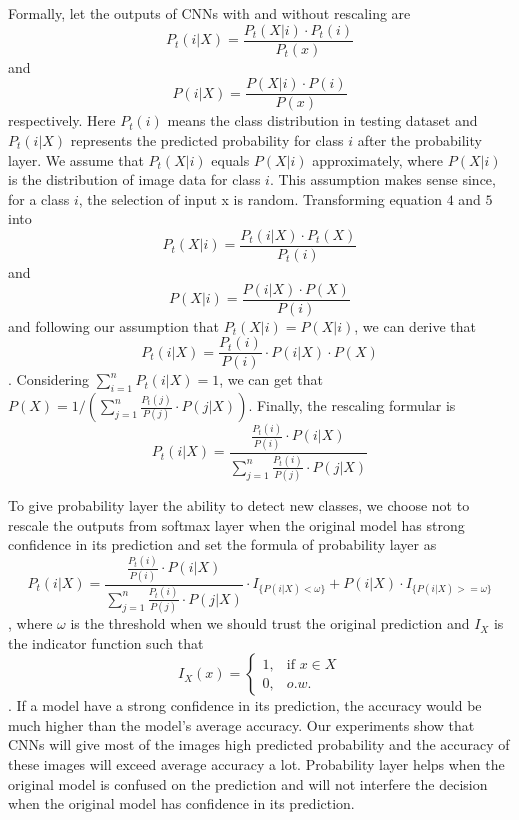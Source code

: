 \documentclass[pageno]{jpaper}
\begin{document}
Formally, let the outputs of CNNs with and without rescaling are
\begin{equation}
    P_t(i|X) = \frac{P_t(X|i) \cdot P_t(i)}{P_t(x)}
\end{equation}
and
\begin{equation}
    P(i|X) = \frac{P(X|i) \cdot P(i)}{P(x)}
\end{equation}
respectively. Here $P_t(i)$ means the class distribution in testing dataset and $P_t(i|X)$ represents the predicted probability for class $i$ after the probability layer. We assume that $P_t(X|i)$ equals $P(X|i)$ approximately, where $P(X|i)$ is the distribution of image data for class $i$. This assumption makes sense since, for a class $i$, the selection of input x is random. Transforming equation $4$ and $5$ into 
\begin{equation}
    P_t(X|i) = \frac{P_t(i|X) \cdot P_t(X)}{P_t(i)}
\end{equation}
and
\begin{equation}
    P(X|i) = \frac{P(i|X) \cdot P(X)}{P(i)}
\end{equation}
and following our assumption that $P_t(X|i) = P(X|i)$, we can derive that 
\begin{equation}
    P_t(i|X) = \frac{P_t(i)}{P(i)}\cdot P(i|X) \cdot P(X) 
\end{equation}. Considering $\sum_{i=1}^n P_t(i|X) = 1$, we can get that $P(X) = 1/(\sum_{j=1}^{n} \frac{P_t(j)}{P(j)} \cdot P(j|X))$. Finally, the rescaling formular is 
\begin{equation}
    P_t(i|X) = \frac{\frac{P_t(i)}{P(i)} \cdot P(i|X)}{\sum_{j=1}^n \frac{P_t(i)}{P(j)} \cdot P(j|X)}
\end{equation}


To give probability layer the ability to detect new classes, we choose not to rescale the outputs from softmax layer when the original model has strong confidence in its prediction and set the formula of probability layer as
\begin{equation}
    P_t(i|X) = \frac{\frac{P_t(i)}{P(i)} \cdot P(i|X)}{\sum_{j=1}^n \frac{P_t(i)}{P(j)} \cdot P(j|X)} \cdot I_{\{P(i|X) < \omega\}} + P(i|X) \cdot I_{\{P(i|X) >= \omega\}}
\end{equation}
, where $\omega$ is the threshold when we should trust the original prediction and $I_X$ is the indicator function such that
\begin{equation}
I_X(x) = \begin{cases}
1, &\text{if $x \in X$}\\
0, &\text{$o.w.$}
\end{cases}
\end{equation}
. If a model have a strong confidence in its prediction, the accuracy would be much higher than the model's average accuracy. Our experiments show that CNNs will give most of the images high predicted probability and the accuracy of these images will exceed average accuracy a lot. Probability layer helps when the original model is confused on the prediction and will not interfere the decision when the original model has confidence in its prediction.
\end{document}
